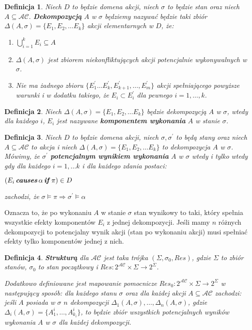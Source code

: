 \documentclass[11pt,a4paper]{article}
\newtheorem{defn}{Definicja}
\DeclareMathOperator{\Causes}{\textbf{\textit{causes}}}
\DeclareMathOperator{\If}{\textbf{\textit{if}}}
\begin{document}
\begin{defn}
Niech $D$ to będzie domena akcji, niech $\sigma$ to będzie stan oraz niech $A \subseteq \mathcal{AC}$. \textbf{Dekompozycją} $A$ w $\sigma$ będziemy nazywać będzie taki zbiór $\Delta(A, \sigma) = \{ E_1, E_2, \dots E_k \}$ akcji elementarnych w $D$, że:
\begin{enumerate}
    \item $\bigcup_{i = 1}^{k} E_i \subseteq A$
    \item  $\Delta(A, \sigma)$ jest zbiorem niekonfliktujących akcji potencjalnie wykonywalnych w  $\sigma$.
    \item Nie ma żadnego zbioru $\{ E_1^\prime \dots E_k^\prime, E_{k+1}^\prime, \dots, E_m^\prime \}$ akcji spełniającego powyższe warunki i w dodatku takiego, że $E_i \subset E_i^\prime$ dla pewnego $i = 1, \dots, k$.
\end{enumerate}
\end{defn}

\begin{defn}
Niech $\Delta(A, \sigma) = \{ E_1, E_2, \dots E_k \}$ będzie dekompozycją $A$ w $\sigma$, wtedy dla każdego $i$, $E_i$ jest nazywane \textbf{komponentem wykonania} $A$ w stanie $\sigma$.
\end{defn}

\begin{defn}
Niech $D$ to będzie domena akcji, niech $\sigma, \sigma^\prime$ to będą stany oraz niech $A \subseteq \mathcal{AC}$ to akcja i niech $\Delta(A, \sigma) = \{ E_1, E_2, \dots E_k \}$ to dekompozycja $A$ w $\sigma$. Mówimy, że $\sigma^\prime$ \textbf{potencjalnym wynikiem wykonania} $A$ w $\sigma$ wtedy i tylko wtedy gdy dla każdego $i = 1, \dots k$ i dla każdego zdania postaci: 
\begin{center}
    $(E_i \Causes \alpha \If \pi) \in D $
\end{center}
zachodzi, że $\sigma \models \pi \Rightarrow \sigma^\prime \models \alpha $
\end{defn} 

Oznacza to, że po wykonaniu $A$ w stanie $\sigma$ stan wynikowy to taki, który spełnia wszystkie efekty komponentów $E_i$ z jednej dekompozycji. Jeśli mamy $n$ różnych dekompozycji to potencjalny wynik akcji (stan po wykonaniu akcji) musi spełniać efekty tylko komponentów jednej z nich.

\begin{defn}
\textbf{Strukturą} dla $\mathcal{AC}$ jest taka trójka $(\Sigma, \sigma_0, Res)$, gdzie $\Sigma$ to zbiór stanów, $\sigma_0$ to stan początkowy i $Res: 2^{\mathcal{AC}} \times \Sigma \rightarrow 2^\Sigma$.

Dodatkowo definiowane jest mapowanie pomocnicze $Res_0: 2^{\mathcal{AC}} \times \Sigma \rightarrow 2^\Sigma$ w następujący sposób: dla każdego stanu $\sigma$ oraz dla każdej akcji $A \subseteq \mathcal{AC}$ zachodzi: jeśli $A$ posiada w $\sigma$ $n$ dekompozycji $\Delta_1(A, \sigma), \dots, \Delta_n(A, \sigma)$, gdzie $\Delta_i(A, \sigma) = \{ A_1^i, \dots, A_{k_i}^i \}$, to będzie zbiór wszystkich potencjalnych wyników wykonania $A$ w $\sigma$ dla każdej dekompozycji.
\end{defn}
\end{document}
